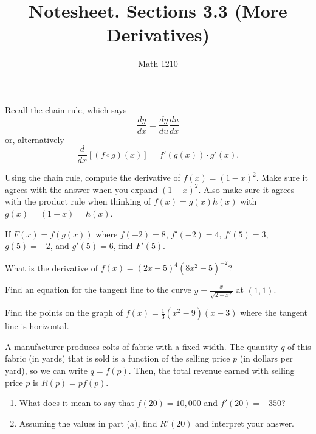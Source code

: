 \documentclass[12pt, a4paper]{article}
\author{Math 1210}
\title{Notesheet. Sections 3.3 (More Derivatives)}
\date{}
\begin{document}
\maketitle
\nameline
\begin{thrm}
  Recall the chain rule, which says \[
    \frac{dy}{dx} = \frac{dy}{du} \frac{du}{dx}
  \]
  or, alternatively \[
    \frac{d}{dx}[(f \circ g)(x)] = f'(g(x)) \cdot g'(x).
  \]
\end{thrm}
\vspace{-10ex}
\begin{ex}
  Using the chain rule, compute the derivative of \(f(x) =
  (1-x)^2\). Make sure it agrees with the answer when you expand
  \((1-x)^2\). Also make sure it agrees with the product rule when
  thinking of \(f(x) = g(x)h(x)\) with \(g(x) = (1-x) = h(x)\).
\end{ex}
\begin{ex}
  If \(F(x) = f(g(x))\) where \(f(-2) = 8\), \(f'(-2) = 4\), \(f'(5) =
  3\), \(g(5)=-2\), and \(g'(5) = 6\), find \(F'(5)\).
\end{ex}
\vspace{-15ex}
\begin{ex}
  What is the derivative of \(f(x) = (2x-5)^4 (8x^2-5)^{-2}\)?
\end{ex}
\begin{ex}
  Find an equation for the tangent line to the curve \(y =
  \frac{|x|}{\sqrt{2-x^2}}\) at \((1,1)\).
\end{ex}
\begin{ex}
  Find the points on the graph of \(f(x) = \frac{1}{3}(x^2-9)(x-3)\) where the tangent line is
  horizontal.
\end{ex}
\begin{ex}
  A manufacturer produces colts of fabric with a fixed width. The
  quantity \(q\) of this fabric (in yards) that is sold is a function
  of the selling price \(p\) (in dollars per yard), so we can write
  \(q = f(p)\). Then, the total revenue earned with selling price
  \(p\) is \(R(p) = pf(p)\).
  \begin{enumerate}
  \item What does it mean to say that \(f(20) = 10,000\) and \(f'(20)
    = -350\)?
  \item Assuming the values in part (a), find \(R'(20)\) and interpret
    your answer.
  \end{enumerate}
\end{ex}
\end{document}

